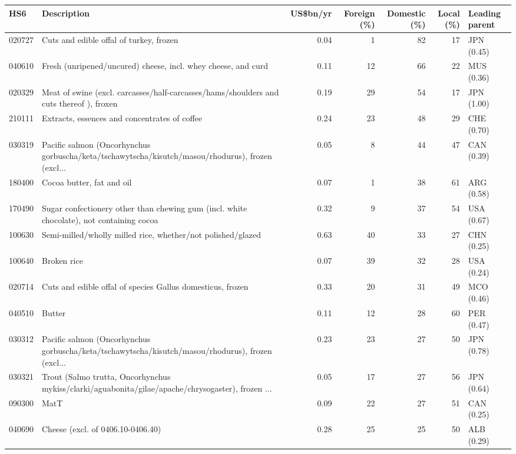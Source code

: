 \begin{tabular}{@{}l p{6.4cm} r r r r l@{}}
\toprule
HS6 & Description & US\$bn/yr & Foreign (\%) & Domestic (\%) & Local (\%) & Leading parent \\
\midrule
020727 & Cuts and edible offal of turkey, frozen & 0.04 & 1 & 82 & 17 & JPN (0.45) \\
040610 & Fresh (unripened/\allowbreak{}uncured) cheese, incl. whey cheese, and curd & 0.11 & 12 & 66 & 22 & MUS (0.36) \\
020329 & Meat of swine (excl. carcasses/\allowbreak{}half-carcasses/\allowbreak{}hams/\allowbreak{}shoulders and cuts thereof ), froxen & 0.19 & 29 & 54 & 17 & JPN (1.00) \\
210111 & Extracts, essences and concentrates of coffee & 0.24 & 23 & 48 & 29 & CHE (0.70) \\
030319 & Pacific salmon (Oncorhynchus gorbuscha/\allowbreak{}keta/\allowbreak{}tschawytscha/\allowbreak{}kisutch/\allowbreak{}masou/\allowbreak{}rhodurus), frozen (excl... & 0.05 & 8 & 44 & 47 & CAN (0.39) \\
180400 & Cocoa butter, fat and oil & 0.07 & 1 & 38 & 61 & ARG (0.58) \\
170490 & Sugar confectionery other than chewing gum (incl. white chocolate), not containing cocoa & 0.32 & 9 & 37 & 54 & USA (0.67) \\
100630 & Semi-milled/\allowbreak{}wholly milled rice, whether/\allowbreak{}not polished/\allowbreak{}glazed & 0.63 & 40 & 33 & 27 & CHN (0.25) \\
100640 & Broken rice & 0.07 & 39 & 32 & 28 & USA (0.24) \\
020714 & Cuts and edible offal of species Gallus domesticus, frozen & 0.33 & 20 & 31 & 49 & MCO (0.46) \\
040510 & Butter & 0.11 & 12 & 28 & 60 & PER (0.47) \\
030312 & Pacific salmon (Oncorhynchus gorbuscha/\allowbreak{}keta/\allowbreak{}tschawytscha/\allowbreak{}kisutch/\allowbreak{}masou/\allowbreak{}rhodurus), frozen (excl... & 0.23 & 23 & 27 & 50 & JPN (0.78) \\
030321 & Trout (Salmo trutta, Oncorhynchus mykiss/\allowbreak{}clarki/\allowbreak{}aguabonita/\allowbreak{}gilae/\allowbreak{}apache/\allowbreak{}chrysogaster), frozen ... & 0.05 & 17 & 27 & 56 & JPN (0.64) \\
090300 & MatT & 0.09 & 22 & 27 & 51 & CAN (0.25) \\
040690 & Cheese (excl. of 0406.10-0406.40) & 0.28 & 25 & 25 & 50 & ALB (0.29) \\

\end{tabular}
